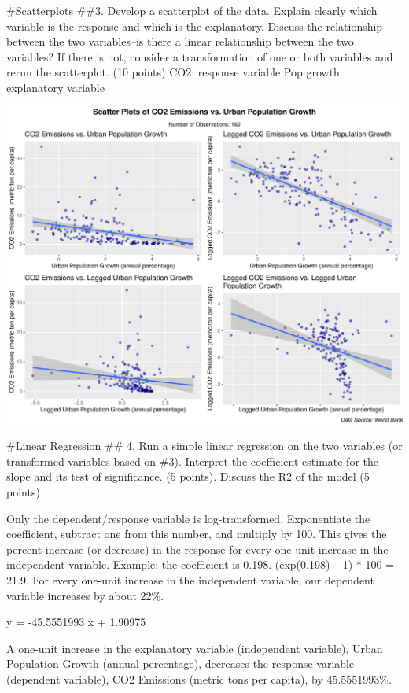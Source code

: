 \documentclass[
]{article}
\begin{document}
\#Scatterplots \#\#3. Develop a scatterplot of the data. Explain clearly
which variable is the response and which is the explanatory. Discuss the
relationship between the two variables--is there a linear relationship
between the two variables? If there is not, consider a transformation of
one or both variables and rerun the scatterplot. (10 points) CO2:
response variable Pop growth: explanatory variable

\includegraphics{LinearLab_files/figure-latex/scatterplots-1.pdf}

\#Linear Regression \#\# 4. Run a simple linear regression on the two
variables (or transformed variables based on \#3). Interpret the
coefficient estimate for the slope and its test of significance. (5
points). Discuss the R2 of the model (5 points)

Only the dependent/response variable is log-transformed. Exponentiate
the coefficient, subtract one from this number, and multiply by 100.
This gives the percent increase (or decrease) in the response for every
one-unit increase in the independent variable. Example: the coefficient
is 0.198. (exp(0.198) -- 1) * 100 = 21.9. For every one-unit increase in
the independent variable, our dependent variable increases by about
22\%.

y = -45.5551993 x + 1.90975

A one-unit increase in the explanatory variable (independent variable),
Urban Population Growth (annual percentage), decreases the response
variable (dependent variable), CO2 Emissions (metric tons per capita),
by 45.5551993\%.
\end{document}
